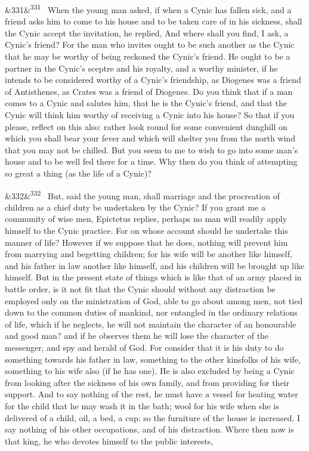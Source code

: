 \documentclass[12pt]{article}
\newcommand{\para}[1][]{\par\noindent\ifx&#1&\else\textsuperscript{\footnotesize #1}~\fi}
\begin{document}
\para[331] When the young man asked, if when a Cynic has fallen sick, and a friend asks him to come to his house and to be taken care of in his sickness, shall the Cynic accept the invitation, he replied, And where shall you find, I ask, a Cynic's friend? For the man who invites ought to be such another as the Cynic that he may be worthy of being reckoned the Cynic's friend. He ought to be a partner in the Cynic's sceptre and his royalty, and a worthy minister, if he intends to be considered worthy of a Cynic's friendship, as Diogenes was a friend of Antisthenes, as Crates was a friend of Diogenes. Do you think that if a man comes to a Cynic and salutes him, that he is the Cynic's friend, and that the Cynic will think him worthy of receiving a Cynic into his house? So that if you please, reflect on this also: rather look round for some convenient dunghill on which you shall bear your fever and which will shelter you from the north wind that you may not be chilled. But you seem to me to wish to go into some man's house and to be well fed there for a time. Why then do you think of attempting so great a thing (as the life of a Cynic)?

\para[332] But, said the young man, shall marriage and the procreation of children as a chief duty be undertaken by the Cynic? If you grant me a community of wise men, Epictetus replies, perhaps no man will readily apply himself to the Cynic practice. For on whose account should he undertake this manner of life? However if we suppose that he does, nothing will prevent him from marrying and begetting children; for his wife will be another like himself, and his father in law another like himself, and his children will be brought up like himself. But in the present state of things which is like that of an army placed in battle order, is it not fit that the Cynic should without any distraction be employed only on the ministration of God, able to go about among men, not tied down to the common duties of mankind, nor entangled in the ordinary relations of life, which if he neglects, he will not maintain the character of an honourable and good man? and if he observes them he will lose the character of the messenger, and spy and herald of God. For consider that it is his duty to do something towards his father in law, something to the other kinsfolks of his wife, something to his wife also (if he has one). He is also excluded by being a Cynic from looking after the sickness of his own family, and from providing for their support. And to say nothing of the rest, he must have a vessel for heating water for the child that he may wash it in the bath; wool for his wife when she is delivered of a child, oil, a bed, a cup: so the furniture of the house is increased. I say nothing of his other occupations, and of his distraction. Where then now is that king, he who devotes himself to the public interests,
\end{document}
